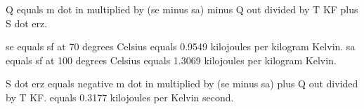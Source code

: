 Q equals m dot in multiplied by (se minus sa) minus Q out divided by T KF plus S dot erz.  

se equals sf at 70 degrees Celsius equals 0.9549 kilojoules per kilogram Kelvin.  
sa equals sf at 100 degrees Celsius equals 1.3069 kilojoules per kilogram Kelvin.  

S dot erz equals negative m dot in multiplied by (se minus sa) plus Q out divided by T KF.  
equals 0.3177 kilojoules per Kelvin second.